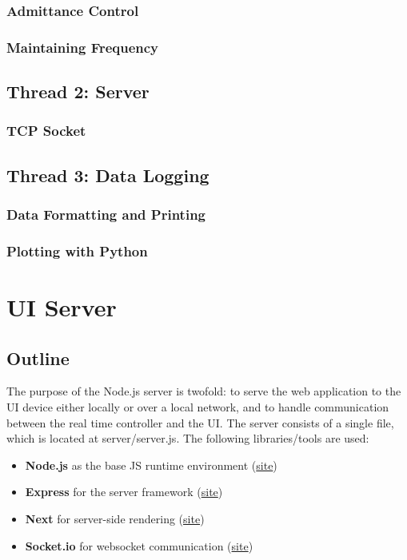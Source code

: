 \documentclass{article}
\begin{document}
	\subsubsection{Admittance Control}
	\subsubsection{Maintaining Frequency}
	

	\subsection{Thread 2: Server}
	\subsubsection{TCP Socket}
	
	\subsection{Thread 3: Data Logging}
	\subsubsection{Data Formatting and Printing}
	\subsubsection{Plotting with Python}

\section{UI Server}
	\subsection{Outline}

	The purpose of the Node.js server is twofold: to serve the web application to the UI device either locally or over a local network, and to handle communication between the real time controller and the UI. The server consists of a single file, which is located at server/server.js. The following libraries/tools are used:
	
	\begin{itemize}
		\item \textbf{Node.js} as the base JS runtime environment (\href{https://nodejs.org/en/}{site})
		\item \textbf{Express} for the server framework (\href{https://expressjs.com/}{site})
		\item \textbf{Next} for server-side rendering (\href{https://nextjs.org/}{site})
		\item \textbf{Socket.io} for websocket communication (\href{https://socket.io/}{site})
	\end{itemize}
		
\end{document}
